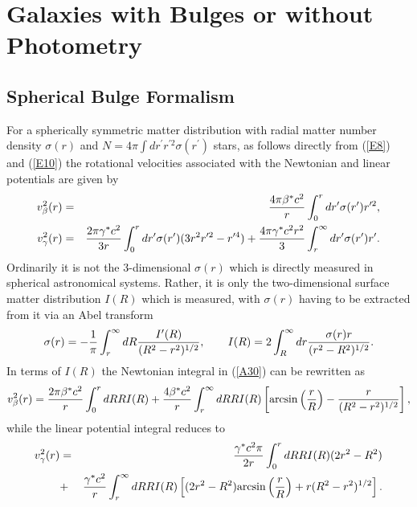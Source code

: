 \documentclass[preprint,aps]{revtex4}
\begin{document}
\appendix
\setcounter{equation}{0}
\def\theequation{A\arabic{equation}}

\section{Galaxies with  Bulges or without Photometry}

\subsection{Spherical Bulge Formalism}


For a spherically symmetric matter distribution with radial matter number density $\sigma(r)$
and $N=4\pi \int  dr^{\prime}r^{\prime 2}\sigma(r^{\prime})$ stars, as follows directly from (\ref{E8}) and (\ref{E10}) the rotational velocities associated with  the Newtonian and linear potentials are given by
% 
\begin{eqnarray}
v^2_{\beta}(r)&=&{4\pi\beta^* c^2\over r}\int_0^r
dr^{\prime}\sigma(r^{\prime}) r^{\prime 2},
\nonumber\\
v^2_{\gamma}(r)&=&{2\pi\gamma^* c^2\over 3r}\int_0^r
dr^{\prime}\sigma(r^{\prime}) (3r^2r^{\prime 2}-r^{\prime 4})
+{4\pi\gamma^* c^2r^2\over 3}\int_r^{\infty} dr^{\prime}\sigma(r^{\prime})
r^{\prime }.
\label{A30}
\end{eqnarray} 
% 
Ordinarily it is not the 3-dimensional $\sigma(r)$ which is directly
measured in spherical astronomical systems. Rather, it is only the
two-dimensional surface matter distribution $I(R)$ which is measured,
with $\sigma(r)$ having to be extracted from it via an Abel transform
% 
\begin{equation}
\sigma(r)=-{1 \over \pi} \int _r^{\infty} dR{ I^{\prime}(R) 
\over (R^2-r^2)^{1/2}},\qquad
I(R)=2\int _R^{\infty} dr {\sigma(r) r \over (r^2-R^2)^{1/2}}.
\label{A31}
\end{equation} 
% 
In terms of $I(R)$ the Newtonian integral in (\ref{A30}) can be rewritten as \cite{Kent1986}
% 
\begin{equation}
v^2_{\beta}(r)={2 \pi \beta^* c^2\over r} \int_0^rdRRI(R) 
+{4 \beta^* c^2\over r}\int_r^{\infty}dRRI(R)
\left[ {\rm arcsin} \left({r \over R} \right) -{r \over
(R^2-r^2)^{1/2}}\right],
\label{A36}
\end{equation} 
% 
while the linear potential integral reduces to  \cite{Mannheim2006}
% 
\begin{eqnarray}
v^2_{\gamma}(r)&=&
{\gamma^* c^2 \pi \over 2r} \int_0^rdRRI(R)(2r^2-R^2)
\nonumber\\
&+&{\gamma^* c^2  \over r}\int_r^{\infty}dRRI(R)
\left[ (2r^2-R^2){\rm arcsin} \left({r \over R} \right)
+r(R^2-r^2)^{1/2}\right].
\label{A37}
\end{eqnarray} 
% 
\end{document}
